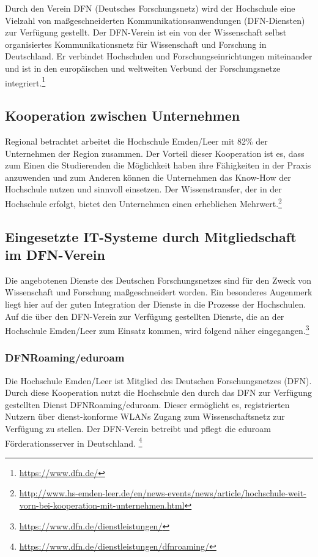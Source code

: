 Durch den Verein DFN (Deutsches Forschungsnetz) wird der Hochschule eine Vielzahl von maßgeschneiderten Kommunikationsanwendungen (DFN-Diensten) zur Verfügung gestellt. Der DFN-Verein ist ein von der Wissenschaft selbst organisiertes Kommunikationsnetz für Wissenschaft und Forschung in Deutschland. Er verbindet Hochschulen und Forschungseinrichtungen miteinander und ist in den europäischen und weltweiten  Verbund der Forschungsnetze integriert.\footnote{\url{https://www.dfn.de/}}

\subsection{Kooperation zwischen Unternehmen}
Regional betrachtet arbeitet die Hochschule Emden/Leer mit 82\% der Unternehmen der Region zusammen. Der Vorteil dieser Kooperation ist es, dass zum Einen die Studierenden die Möglichkeit haben ihre Fähigkeiten in der Praxis anzuwenden und zum Anderen können die Unternehmen das Know-How  der Hochschule nutzen und sinnvoll einsetzen. Der Wissenstransfer, der in der Hochschule erfolgt, bietet den Unternehmen einen erheblichen Mehrwert.\footnote{\url{http://www.hs-emden-leer.de/en/news-events/news/article/hochschule-weit-vorn-bei-kooperation-mit-unternehmen.html}}

\subsection{Eingesetzte IT-Systeme durch Mitgliedschaft im DFN-Verein}
Die angebotenen Dienste des Deutschen Forschungsnetzes sind für den Zweck von Wissenschaft und Forschung maßgeschneidert worden. Ein besonderes Augenmerk liegt hier auf der guten Integration der Dienste in die Prozesse der Hochschulen.  Auf die über den DFN-Verein zur Verfügung gestellten Dienste, die an der Hochschule Emden/Leer zum Einsatz kommen, wird folgend näher eingegangen.\footnote{\url{https://www.dfn.de/dienstleistungen/}}

\subsubsection{DFNRoaming/eduroam}
Die Hochschule Emden/Leer ist Mitglied des Deutschen Forschungsnetzes (DFN). Durch diese Kooperation nutzt die Hochschule den durch das DFN zur Verfügung gestellten Dienst DFNRoaming/eduroam. Dieser ermöglicht es, registrierten Nutzern über dienst-konforme WLANs Zugang zum Wissenschaftsnetz zur Verfügung zu stellen. Der DFN-Verein betreibt und pflegt die eduroam Förderationsserver in Deutschland. \footnote{\url{https://www.dfn.de/dienstleistungen/dfnroaming/}} 

